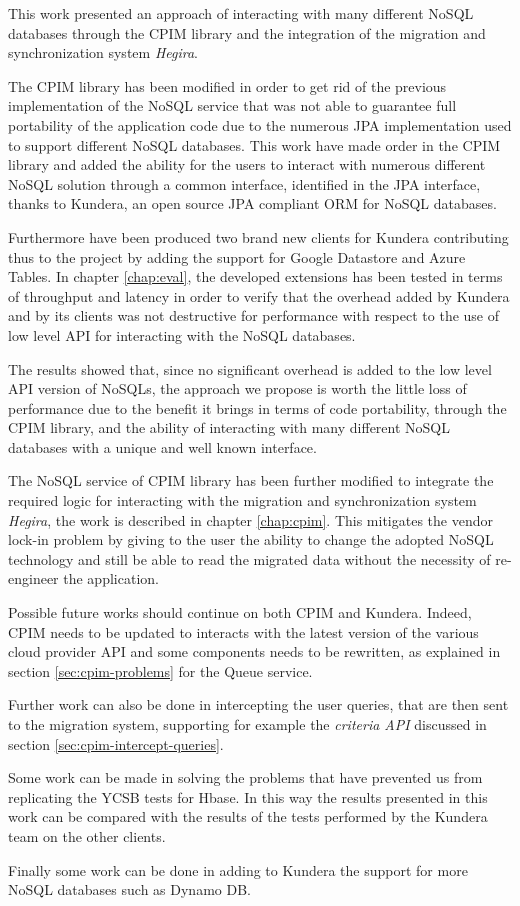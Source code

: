 This work presented an approach of interacting with many different NoSQL databases through the CPIM library and the integration of the migration and synchronization system \textit{Hegira}.

\newparagraph The CPIM library has been modified in order to get rid of the previous implementation of the NoSQL service that was not able to guarantee full portability of the application code due to the numerous JPA implementation used to support different NoSQL databases. This work have made order in the CPIM library and added the ability for the users to interact with numerous different NoSQL solution through a common interface, identified in the JPA interface, thanks to Kundera, an open source JPA compliant ORM for NoSQL databases.

\noindent Furthermore have been produced two brand new clients for Kundera contributing thus to the project by adding the support for Google Datastore and Azure Tables. In chapter \ref{chap:eval}, the developed extensions has been tested in terms of throughput and latency in order to verify that the overhead added by Kundera and by its clients was not destructive for performance with respect to the use of low level API for interacting with the NoSQL databases.

\noindent The results showed that, since no significant overhead is added to the low level API version of NoSQLs, the approach we propose is worth the little loss of performance due to the benefit it brings in terms of code portability, through the CPIM library, and the ability of interacting with many different NoSQL databases with a unique and well known interface.

\newparagraph\newparagraph The NoSQL service of CPIM library has been further modified to integrate the required logic for interacting with the migration and synchronization system \textit{Hegira}, the work is described in chapter \ref{chap:cpim}. This mitigates the vendor lock-in problem by giving to the user the ability to change the adopted NoSQL technology and still be able to read the migrated data without the necessity of re-engineer the application.
 
\newparagraph Possible future works should continue on both CPIM and Kundera. Indeed, CPIM needs to be updated to interacts with the latest version of the various cloud provider API and some components needs to be rewritten, as explained in section \ref{sec:cpim-problems} for the Queue service.

\noindent Further work can also be done in intercepting the user queries, that are then sent to the migration system, supporting for example the \textit{criteria API} discussed in section \ref{sec:cpim-intercept-queries}.

\noindent Some work can be made in solving the problems that have prevented us from replicating the YCSB tests for Hbase. In this way the results presented in this work can be compared with the results of the tests performed by the Kundera team on the other clients.

\noindent Finally some work can be done in adding to Kundera the support for more NoSQL databases such as Dynamo DB.
